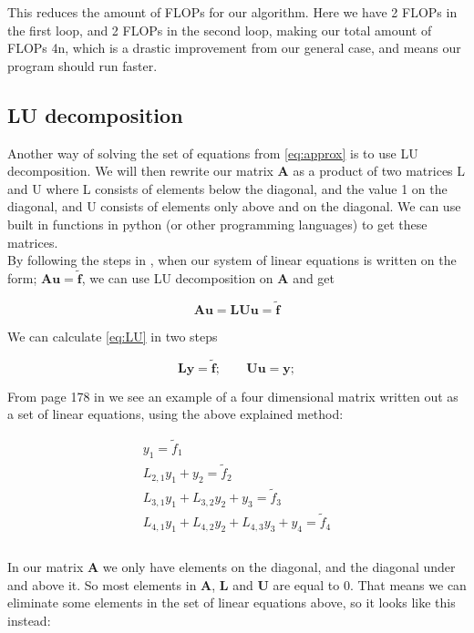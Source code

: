 \documentclass[oneside, final, 11pt, english, twocolumn]{article}
\begin{document}
This reduces the amount of FLOPs for our algorithm. Here we have 2 FLOPs in the first loop, and 2 FLOPs in the second loop, making our total amount of FLOPs 4n, which is a drastic improvement from our general case, and means our program should run faster. 

\subsection{LU decomposition}

Another way of solving the set of equations from \ref{eq:approx} is to use LU decomposition. We will then rewrite our matrix $\mathbf{A}$ as a product of two matrices L and U where L consists of elements below the diagonal, and the value 1 on the diagonal, and U consists of elements only above and on the diagonal. We can use built in functions in python (or other programming languages) to get these matrices. \\

By following the steps in \cite[s.177-178]{stat}, when our system of linear equations is written on the form; $\mathbf{A}\mathbf{u} = \tilde{\mathbf{f}}$, we can use LU decomposition on $\mathbf{A}$ and get  

\begin{equation}
\mathbf{A}\mathbf{u} = \mathbf{LU} \mathbf{u} = \tilde{\mathbf{f}}
\label{eq:LU}
\end{equation}

We can calculate \eqref{eq:LU} in two steps

\begin{equation}
\mathbf{L}\mathbf{y} =\tilde{\mathbf{f}}; \;\; \; \; \; \; \; \mathbf{U}\mathbf{u} = \mathbf{y}; 
\end{equation}

From page 178 in \cite{stat} we see an example of a four dimensional matrix written out as a set of linear equations, using the above explained method: 


\begin{align*}
y_1 = \tilde{f}_1 \\
L_{2,1}y_1 + y_2 = \tilde{f}_2 \\
L_{3,1} y_1 + L_{3,2}y_2 + y_3 = \tilde{f}_3\\
L_{4,1}y_1 + L_{4,2} y_2 + L_{4,3}y_3 + y_4 = \tilde{f}_4 \\
 \\
\end{align*}

In our matrix $\mathbf{A}$ we only have elements on the diagonal, and the diagonal under and above it. So most elements in $\mathbf{A}$, $\mathbf{L}$ and $\mathbf{U}$ are equal to 0. That means we can eliminate some elements in the set of linear equations above, so it looks like this instead: 
\end{document}
